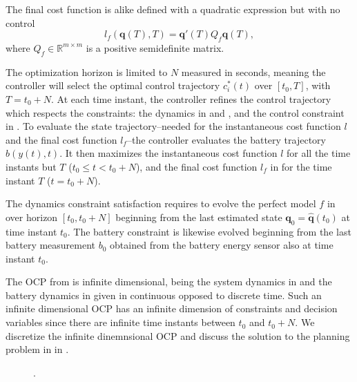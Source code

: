 The final cost function is alike defined with a quadratic expression but with no control
\begin{equation}\label{eq:final-cost-mpc}
  l_f(\mathbf{q}(T),T)=\mathbf{q}'(T)Q_f\mathbf{q}(T),
\end{equation}
where $Q_f\in\mathbb{R}^{m\times m}$ is a positive semidefinite matrix. %

The optimization horizon is limited to $N$ measured in seconds, meaning the controller will select the optimal control trajectory $c_i^*(t)$ over $[t_0,T]$, with $T=t_0+N$. At each time instant, the controller refines the control trajectory which respects the constraints: the dynamics in  and , and the control constraint in . To evaluate the state trajectory--needed for the instantaneous cost function $l$ and the final cost function $l_f$--the controller evaluates the battery trajectory $b(y(t),t)$. It then maximizes the instantaneous cost function $l$ for all the time instants but $T$ ($t_0\leq t < t_0+N$), and the final cost function $l_f$ in  for the time instant $T$ ($t=t_0+N$).

The dynamics constraint satisfaction requires to evolve the perfect model $f$ in  over horizon $[t_0,t_0+N]$ beginning from the last estimated state $\mathbf{q}_0=\hat{\mathbf{q}}(t_0)$ at time instant $t_0$. The battery constraint is likewise evolved beginning from the last battery measurement $b_0$ obtained from the battery energy sensor also at time instant $t_0$.

The OCP from  is infinite dimensional, being the system dynamics in  and the battery dynamics in  given in continuous opposed to discrete time. Such an infinite dimensional OCP has an infinite dimension of constraints and decision variables since there are infinite time instants between $t_0$ and $t_0+N$. We discretize the infinite dinemnsional OCP and discuss the solution to the planning problem in  in .

\begin{figure}[h]
  \centering
  \selectfont
  
  \caption[.]{.}
  \label{fig:plot-7}
\end{figure}

